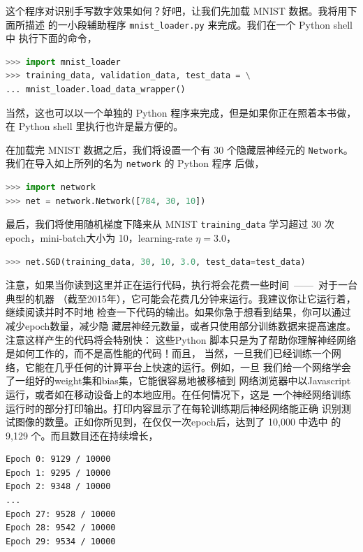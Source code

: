 

这个程序对识别手写数字效果如何？好吧，让我们先加载 MNIST 数据。我将用下面所描述
的一小段辅助程序 \lstinline!mnist_loader.py! 来完成。我们在一个 Python shell 中
执行下面的命令，

\begin{lstlisting}[language=Python]
>>> import mnist_loader
>>> training_data, validation_data, test_data = \
... mnist_loader.load_data_wrapper()
\end{lstlisting}

当然，这也可以以一个单独的 Python 程序来完成，但是如果你正在照着本书做，在
Python shell 里执行也许是最方便的。

在加载完 MNIST 数据之后，我们将设置一个有 30 个隐藏层神经元的
\lstinline!Network!。我们在导入如上所列的名为 \lstinline!network! 的 Python 程序
后做，

\begin{lstlisting}[language=Python]
>>> import network
>>> net = network.Network([784, 30, 10])
\end{lstlisting}

最后，我们将使用随机梯度下降来从 MNIST \lstinline!training_data! 学习超过 30 次%
\gls*{epoch}，\gls*{mini-batch}大小为 10，\gls*{learning-rate} $\eta = 3.0$，

\begin{lstlisting}[language=Python]
>>> net.SGD(training_data, 30, 10, 3.0, test_data=test_data)
\end{lstlisting}

注意，如果当你读到这里并正在运行代码，执行将会花费一些时间~——~对于一台典型的机器
（截至2015年），它可能会花费几分钟来运行。我建议你让它运行着，继续阅读并时不时地
检查一下代码的输出。如果你急于想看到结果，你可以通过减少\gls*{epoch}数量，减少隐
藏层神经元数量，或者只使用部分训练数据来提高速度。注意这样产生的代码将会特别快：
这些Python 脚本只是为了帮助你理解神经网络是如何工作的，而不是高性能的代码！而且，
当然，一旦我们已经训练一个网络，它能在几乎任何的计算平台上快速的运行。例如，一旦
我们给一个网络学会了一组好的\gls*{weight}集和\gls*{bias}集，它能很容易地被移植到
网络浏览器中以Javascript 运行，或者如在移动设备上的本地应用。在任何情况下，这是
一个神经网络训练运行时的部分打印输出。打印内容显示了在每轮训练期后神经网络能正确
识别测试图像的数量。正如你所见到，在仅仅一次\gls*{epoch}后，达到了 10,000 中选中
的 9,129 个。而且数目还在持续增长，

\begin{lstlisting}[language=sh]
Epoch 0: 9129 / 10000
Epoch 1: 9295 / 10000
Epoch 2: 9348 / 10000
...
Epoch 27: 9528 / 10000
Epoch 28: 9542 / 10000
Epoch 29: 9534 / 10000
\end{lstlisting}


